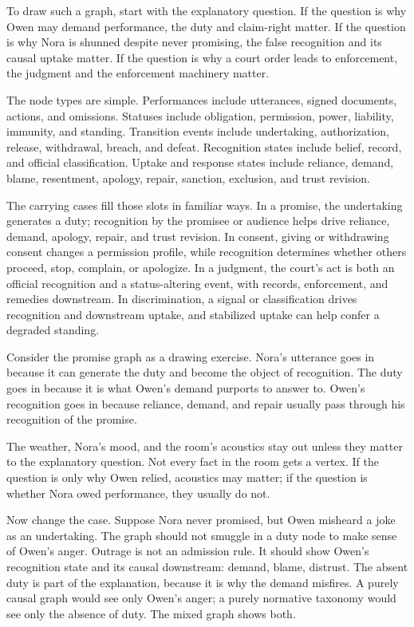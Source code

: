 \documentclass[12pt]{article}
\begin{document}
To draw such a graph, start with the explanatory question. If the question is why Owen may demand performance, the duty and claim-right matter. If the question is why Nora is shunned despite never promising, the false recognition and its causal uptake matter. If the question is why a court order leads to enforcement, the judgment and the enforcement machinery matter.

The node types are simple. Performances include utterances, signed documents, actions, and omissions. Statuses include obligation, permission, power, liability, immunity, and standing. Transition events include undertaking, authorization, release, withdrawal, breach, and defeat. Recognition states include belief, record, and official classification. Uptake and response states include reliance, demand, blame, resentment, apology, repair, sanction, exclusion, and trust revision.

The carrying cases fill those slots in familiar ways. In a promise, the undertaking generates a duty; recognition by the promisee or audience helps drive reliance, demand, apology, repair, and trust revision. In consent, giving or withdrawing consent changes a permission profile, while recognition determines whether others proceed, stop, complain, or apologize. In a judgment, the court's act is both an official recognition and a status-altering event, with records, enforcement, and remedies downstream. In discrimination, a signal or classification drives recognition and downstream uptake, and stabilized uptake can help confer a degraded standing.

Consider the promise graph as a drawing exercise. Nora's utterance goes in because it can generate the duty and become the object of recognition. The duty goes in because it is what Owen's demand purports to answer to. Owen's recognition goes in because reliance, demand, and repair usually pass through his recognition of the promise.

The weather, Nora's mood, and the room's acoustics stay out unless they matter to the explanatory question. Not every fact in the room gets a vertex. If the question is only why Owen relied, acoustics may matter; if the question is whether Nora owed performance, they usually do not.

Now change the case. Suppose Nora never promised, but Owen misheard a joke as an undertaking. The graph should not smuggle in a duty node to make sense of Owen's anger. Outrage is not an admission rule. It should show Owen's recognition state and its causal downstream: demand, blame, distrust. The absent duty is part of the explanation, because it is why the demand misfires. A purely causal graph would see only Owen's anger; a purely normative taxonomy would see only the absence of duty. The mixed graph shows both.
\end{document}
